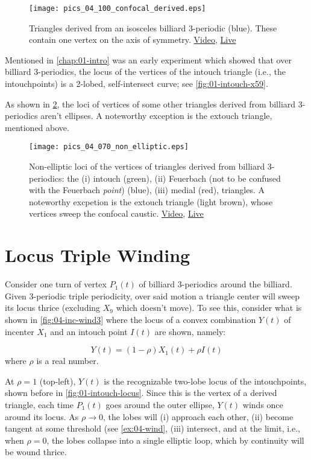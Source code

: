 \begin{figure}
    \centering
    \texttt{[image: pics\_04\_100\_confocal\_derived.eps]}
    \caption{Triangles derived from an isosceles billiard 3-periodic (blue). These contain one vertex on the axis of symmetry. \href{https://youtu.be/xyroRTEVNDc}{Video}, \href{https://bit.ly/3fyylD0}{Live}}
    \label{fig:04-derived-isosceles}
\end{figure}

Mentioned in \cref{chap:01-intro} was an early experiment which showed that over billiard 3-periodics, the locus of the vertices of the intouch triangle (i.e., the intouchpoints) is a 2-lobed, self-intersect curve; see \cref{fig:01-intouch-x59}.

As shown in \cref{fig:04-locus-x11-x100}, the loci of vertices of some other triangles derived from billiard 3-periodics aren't ellipses. A noteworthy exception is the extouch triangle, mentioned above.

\begin{figure}
    \centering
    \texttt{[image: pics\_04\_070\_non\_elliptic.eps]}
    \caption{Non-elliptic loci of the vertices of triangles derived from billiard 3-periodics: the (i) intouch (green), (ii) Feuerbach (not to be confused with the Feuerbach {\em point}) (blue), (iii) medial (red), triangles. A noteworthy excpetion is the extouch triangle (light brown), whose vertices sweep the confocal caustic.
     \href{https://youtu.be/OGvCQbYqJyI}{Video}, \href{https://bit.ly/3orrSxQ}{Live}}
    \label{fig:04-locus-x11-x100}
\end{figure}



\section{Locus Triple Winding}

Consider one turn of vertex $P_1(t)$ of billiard 3-periodics around the billiard. Given 3-periodic triple periodicity, over said motion a triangle center will sweep its locus thrice (excluding $X_9$ which doesn't move). To see this, consider what is shown in \cref{fig:04-inc-wind3} where the locus of a convex combination $Y(t)$ of incenter $X_1$ and an intouch point $I(t)$ are shown, namely:

\[ Y(t) = (1-\rho) X_1(t) +  \rho I(t)  \]
where $\rho$ is a real number.

At $\rho=1$ (top-left), $Y(t)$ is the recognizable two-lobe locus of the intouchpoints, shown before in \cref{fig:01-intouch-locus}. Since this is the vertex of a derived triangle, each time $P_1(t)$ goes around the outer ellipse, $Y(t)$ winds once around its locus. As  $\rho{\rightarrow}0$, the lobes will (i) approach each other, (ii) become tangent at some threshold (see \cref{ex:04-wind}, (iii) intersect, and at the limit, i.e., when $\rho=0$, the lobes collapse into a single elliptic loop, which by continuity will be wound thrice.

